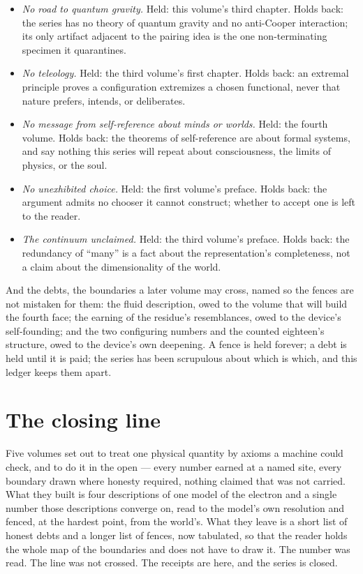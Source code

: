 \begin{itemize}
analysis) and, more rigorously, \emph{defines} its own difference by a
finite boxing under which the first and second variation are one --- a
machine-checked, identity-decided fact that resonates with Heisenberg's
non-resolvability and instantiates no quantum uncertainty. The kinship to
the fourth volume's self-fences is of family, not identity: a
finite-resolution result, not an undefinability.
\item \emph{No road to quantum gravity.} Held: this volume's third chapter.
Holds back: the series has no theory of quantum gravity and no anti-Cooper
interaction; its only artifact adjacent to the pairing idea is the one
non-terminating specimen it quarantines.
\item \emph{No teleology.} Held: the third volume's first chapter. Holds
back: an extremal principle proves a configuration extremizes a chosen
functional, never that nature prefers, intends, or deliberates.
\item \emph{No message from self-reference about minds or worlds.} Held:
the fourth volume. Holds back: the theorems of self-reference are about
formal systems, and say nothing this series will repeat about
consciousness, the limits of physics, or the soul.
\item \emph{No unexhibited choice.} Held: the first volume's preface. Holds
back: the argument admits no chooser it cannot construct; whether to accept
one is left to the reader.
\item \emph{The continuum unclaimed.} Held: the third volume's preface.
Holds back: the redundancy of ``many'' is a fact about the representation's
completeness, not a claim about the dimensionality of the world.
\end{itemize}

And the debts, the boundaries a later volume may cross, named so the fences
are not mistaken for them: the fluid description, owed to the volume that
will build the fourth face; the earning of the residue's resemblances, owed
to the device's self-founding; and the two configuring numbers and the
counted eighteen's structure, owed to the device's own deepening. A fence
is held forever; a debt is held until it is paid; the series has been
scrupulous about which is which, and this ledger keeps them apart.

\section*{The closing line}

Five volumes set out to treat one physical quantity by axioms a machine
could check, and to do it in the open --- every number earned at a named
site, every boundary drawn where honesty required, nothing claimed that was
not carried. What they built is four descriptions of one model of the
electron and a single number those descriptions converge on, read to the
model's own resolution and fenced, at the hardest point, from the world's.
What they leave is a short list of honest debts and a longer list of fences,
now tabulated, so that the reader holds the whole map of the boundaries and
does not have to draw it. The number was read. The line was not crossed.
The receipts are here, and the series is closed.
